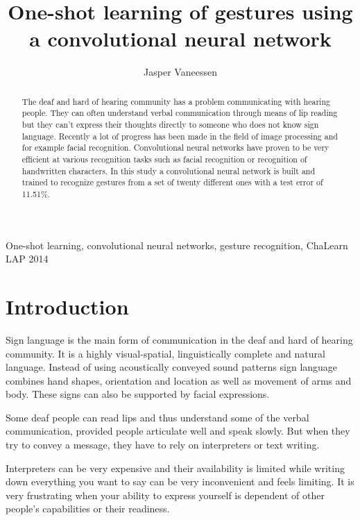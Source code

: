 \documentclass[twocolumn]{phdsymp} %
\begin{document}
\title{One-shot learning of gestures using a convolutional neural network} %

\author{Jasper Vaneessen}


\maketitle

\begin{abstract}
The deaf and hard of hearing community has  a problem communicating with hearing people. They can often understand verbal communication through means of lip reading but they can't express their thoughts directly to someone who does not know sign language. Recently a lot of progress has been made in the field of image processing and for example facial recognition. Convolutional neural networks have proven to be very efficient at various recognition tasks such as facial recognition or recognition of handwritten characters. In this study a convolutional neural network is built and trained to recognize gestures from a set of twenty different ones with a test error of 11.51\%.
\end{abstract}

\begin{keywords}
One-shot learning, convolutional neural networks, gesture recognition, ChaLearn LAP 2014
\end{keywords}

\section{Introduction}
Sign language is the main form of communication in the deaf and hard of hearing community. It is a highly visual-spatial, linguistically complete and natural language. Instead of using acoustically conveyed sound patterns sign language combines hand shapes, orientation and location as well as movement of arms and body. These signs can also be supported by facial expressions.

Some deaf people can read lips and thus understand some of the verbal communication, provided people articulate well and speak slowly. But when they try to convey a message, they have to rely on interpreters or text writing.

Interpreters can be very expensive and their availability is limited while writing down everything you want to say can be very inconvenient and feels limiting. It is very frustrating when your ability to express yourself is dependent of other people’s capabilities or their readiness.
\end{document}
